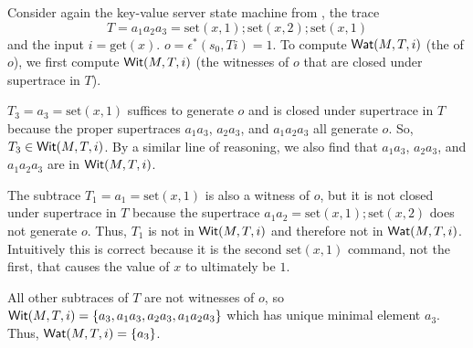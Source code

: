 \begin{example}
  \newcommand{\Mget}{\text{get}}
  \newcommand{\Mset}{\text{set}}
  Consider again the key-value server state machine from
  , the trace
  \[
    T = a_1 a_2 a_3 = \Mset(x, 1); \Mset(x, 2); \Mset(x, 1)
  \]
  and the input $i = \Mget(x)$. $o = \epsilon^*(s_0, Ti) = 1$. To compute
  $\textsf{Wat}(M, T, i)$ (the \watprovenance{} of $o$), we first compute $\textsf{Wit}(M, T,
  i)$ (the witnesses of $o$ that are closed under supertrace in $T$).


  $T_3 = a_3 = \Mset(x, 1)$ suffices to generate $o$ and is closed under
  supertrace in $T$ because the proper supertraces $a_1a_3$, $a_2a_3$, and
  $a_1a_2a_3$ all generate $o$. So, $T_3 \in \textsf{Wit}(M, T, i)$. By a similar line
  of reasoning, we also find that $a_1a_3$, $a_2a_3$, and $a_1a_2a_3$ are in
  $\textsf{Wit}(M, T, i)$.

  The subtrace $T_1 = a_1 = \Mset(x, 1)$ is also a witness of $o$, but it is
  not closed under supertrace in $T$ because the supertrace $a_1a_2 = \Mset(x,
  1); \Mset(x, 2)$ does not generate $o$. Thus, $T_1$ is not in $\textsf{Wit}(M, T, i)$
  and therefore not in $\textsf{Wat}(M, T, i)$. Intuitively this is correct because it
  is the second $\Mset(x, 1)$ command, not the first, that causes the value of
  $x$ to ultimately be $1$.

  All other subtraces of $T$ are not witnesses of $o$, so $\textsf{Wit}(M, T, i) =
  \{a_3, a_1a_3, a_2a_3, a_1a_2a_3\}$ which has unique minimal element $a_3$.
  Thus, $\textsf{Wat}(M, T, i) = \{a_3\}$.
\end{example}

